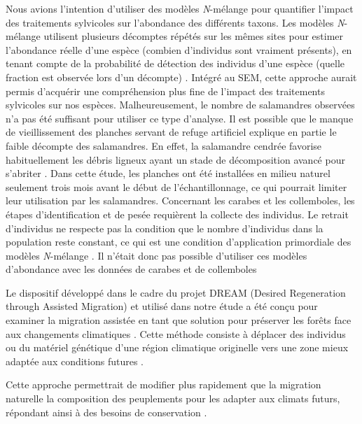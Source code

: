 Nous avions l’intention d’utiliser des modèles \textit{N}-mélange pour quantifier l'impact des traitements sylvicoles sur l'abondance des différents taxons. 
Les modèles \textit{N}-mélange utilisent plusieurs décomptes répétés sur les mêmes sites pour estimer l'abondance réelle d'une espèce (combien d'individus sont vraiment présents), en tenant compte de la probabilité de détection des individus d'une espèce (quelle fraction est observée lors d'un décompte) \citep{Royle2004Nmixturemodels,Mazerolle2021Woodlandsalamander}. 
Intégré au SEM, cette approche aurait permis d'acquérir une compréhension plus fine de l'impact des traitements sylvicoles sur nos espèces. 
Malheureusement, le nombre de salamandres observées n'a pas été suffisant pour utiliser ce type d'analyse. 
Il est possible que le manque de vieillissement des planches servant de refuge artificiel explique en partie le faible décompte des salamandres. 
En effet, la salamandre cendrée favorise habituellement les débris ligneux ayant un stade de décomposition avancé pour s'abriter \citep{Otto2011ComparingCover,hedrickEffectsCoverboardAge2021}. 
Dans cette étude, les planches ont été installées en milieu naturel seulement trois mois avant le début de l'échantillonnage, ce qui pourrait limiter leur utilisation par les salamandres. 
Concernant les carabes et les collemboles, les étapes d’identification et de pesée requièrent la collecte des individus. 
Le retrait d’individus ne respecte pas la condition que le nombre d’individus dans la population reste constant, ce qui est une condition d'application primordiale des modèles \textit{N}-mélange \citep{Royle2004Nmixturemodels}. 
Il n’était donc pas possible d’utiliser ces modèles d’abondance avec les données de carabes et de collemboles

Le dispositif développé dans le cadre du projet DREAM (Desired Regeneration through Assisted Migration) et utilisé dans notre étude a été conçu pour examiner la migration assistée en tant que solution pour préserver les forêts face aux changements climatiques \citep{royoDesiredREgenerationAssisted2023}. 
Cette méthode consiste à déplacer des individus ou du matériel génétique d’une région climatique originelle vers une zone mieux adaptée aux conditions futures \citep{Vitt2010Assistedmigration}. 

Cette approche permettrait de modifier plus rapidement que la migration naturelle la composition des peuplements pour les adapter aux climats futurs, répondant ainsi à des besoins de conservation \citep{Dumroese2015Considerationsrestoring,Park2018Informationunderload,Park2023Provenancetrials}. 

